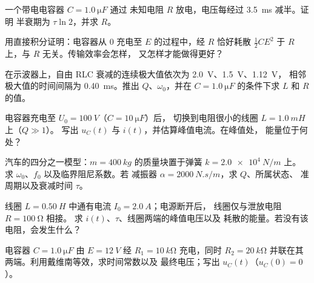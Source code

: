 \begin{exercise}[$\star\star$]\label{exo:b1:transient-regimes:5}
一个带电电容器 $C = \qty{1.0}{\micro F}$ 通过
未知电阻 $R$ 放电，电压每经过 \qty{3.5}{ms} 减半。证明
半衰期为 $\tau\ln 2$，并求 $R$。
\end{exercise}

\begin{exercise}[$\star\star$]\label{exo:b1:transient-regimes:6}
用直接积分证明：电容器从 $0$ 充电至 $E$
的过程中，经 $R$ 恰好耗散 $\tfrac12 CE^2$ 于 $R$ 上，与
$R$ 无关。传输效率会怎样，
又怎样才能做得更好？
\end{exercise}

\begin{exercise}[$\star\star$]\label{exo:b1:transient-regimes:7}
在示波器上，自由 RLC 衰减的连续极大值依次为
\qty{2.0}{V}、\qty{1.5}{V}、\qty{1.12}{V}，
相邻极大值的时间间隔为 \qty{0.40}{ms}。推出 $Q$、$\omega_0$，并在 $C = \qty{1.0}{\micro F}$ 的条件下求
$L$ 和 $R$ 的值。
\end{exercise}

\begin{exercise}[$\star\star$]\label{exo:b1:transient-regimes:8}
电容器充电至 $U_0 = \qty{100}{V}$（$C = \qty{10}{\micro F}$）后，
切换到电阻很小的线圈 $L = \qty{1.0}{mH}$ 上（$Q \gg 1$）。
写出 $u_C(t)$ 与 $i(t)$，并估算峰值电流。在峰值处，
能量位于何处？
\end{exercise}

\begin{exercise}[$\star\star$]\label{exo:b1:transient-regimes:9}
汽车的四分之一模型：$m = \qty{400}{kg}$ 的质量块置于弹簧 $k = \qty{2.0e4}{N/m}$ 上。
求 $\omega_0$、$f_0$ 以及临界阻尼系数。若
减振器 $\alpha = \qty{2000}{N.s/m}$，求 $Q$、所属状态、
准周期以及衰减时间 $\tau$。
\end{exercise}

\begin{exercise}[$\star\star\star$]\label{exo:b1:transient-regimes:10}
线圈 $L = \qty{0.50}{H}$ 中通有电流 $I_0 = \qty{2.0}{A}$；电源断开后，
线圈仅与泄放电阻 $R = \qty{100}{\ohm}$ 相接。
求 $i(t)$、$\tau$、线圈两端的峰值电压以及
耗散的能量。若没有该电阻，会发生什么？
\end{exercise}

\begin{exercise}[$\star\star\star$]\label{exo:b1:transient-regimes:11}
电容器 $C = \qty{1.0}{\micro F}$ 由 $E = \qty{12}{V}$ 经
$R_1 = \qty{10}{k\ohm}$ 充电，同时 $R_2 = \qty{20}{k\ohm}$
并联在其两端。利用戴维南等效，求时间常数以及
最终电压；写出 $u_C(t)$（$u_C(0) = 0$）。
\end{exercise}

